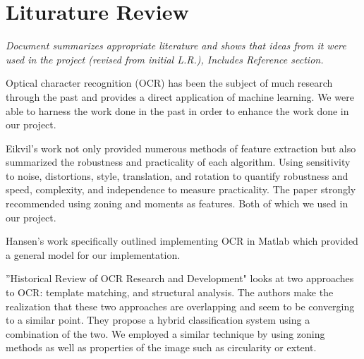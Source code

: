 \section{Liturature Review}
\textit{Document summarizes appropriate literature and shows that ideas from it were used in the project (revised from initial L.R.), Includes Reference section. 
}

Optical character recognition (OCR) has been the subject of much research through the past and provides a direct application of machine learning. We were able to harness the work done in the past in order to enhance the work done in our project. 

Eikvil's work \cite{one} not only provided numerous methods of feature extraction but also summarized the robustness and practicality of each algorithm. Using sensitivity to noise, distortions, style, translation, and rotation to quantify robustness and speed, complexity, and independence to measure practicality. The paper strongly recommended using zoning and moments as features. Both of which we used in our project.

Hansen's work \cite{two} specifically outlined implementing OCR in Matlab which provided a general model for our implementation.

''Historical Review of OCR Research and Development" \cite{three} looks at two approaches to OCR: template matching, and structural analysis. The authors make the realization that these two approaches are overlapping and seem to be converging to a similar point. They propose a hybrid classification system using a combination of the two. We employed a similar technique by using zoning methods as well as properties of the image such as circularity or extent.